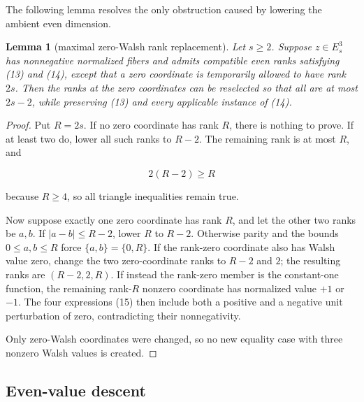 \documentclass[11pt]{article}
\newtheorem{lemma}[theorem]{Lemma}
\theoremstyle{remark}
\begin{document}
The following lemma resolves the only obstruction caused by lowering the ambient even dimension.

\begin{lemma}[maximal zero-Walsh rank replacement]

Let $s\ge 2$. Suppose $z \in E_s^3$ has nonnegative normalized fibers and admits compatible even ranks satisfying (13) and (14), except that a zero coordinate is temporarily allowed to have rank $2s$. Then the ranks at the zero coordinates can be reselected so that all are at most $2s-2$, while preserving (13) and every applicable instance of (14).

\end{lemma}
\begin{proof}

Put $R=2s$. If no zero coordinate has rank $R$, there is nothing to prove. If at least two do, lower all such ranks to $R-2$. The remaining rank is at most $R$, and

\[
2(R-2)\ge R
\]

because $R\ge 4$, so all triangle inequalities remain true.

Now suppose exactly one zero coordinate has rank $R$, and let the other two ranks be $a,b$. If $|a-b|\le R-2$, lower $R$ to $R-2$. Otherwise parity and the bounds $0\le a,b\le R$ force $\{a,b\}=\{0,R\}$. If the rank-zero coordinate also has Walsh value zero, change the two zero-coordinate ranks to $R-2$ and $2$; the resulting ranks are $(R-2,2,R)$. If instead the rank-zero member is the constant-one function, the remaining rank-$R$ nonzero coordinate has normalized value $+1$ or $-1$. The four expressions (15) then include both a positive and a negative unit perturbation of zero, contradicting their nonnegativity.

Only zero-Walsh coordinates were changed, so no new equality case with three nonzero Walsh values is created.

\end{proof}
\subsection{Even-value descent}
\end{document}
